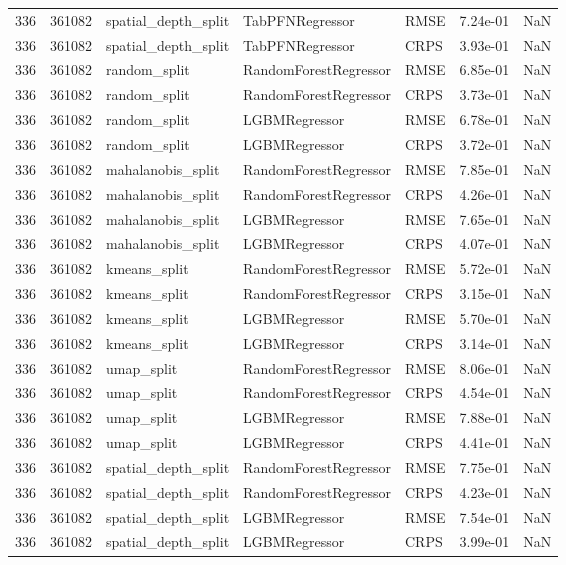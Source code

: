 \begin{tabular}{rrlllrr}
336 & 361082 & spatial\_depth\_split & TabPFNRegressor & RMSE & 7.24e-01 & NaN \\
336 & 361082 & spatial\_depth\_split & TabPFNRegressor & CRPS & 3.93e-01 & NaN \\
336 & 361082 & random\_split & RandomForestRegressor & RMSE & 6.85e-01 & NaN \\
336 & 361082 & random\_split & RandomForestRegressor & CRPS & 3.73e-01 & NaN \\
336 & 361082 & random\_split & LGBMRegressor & RMSE & 6.78e-01 & NaN \\
336 & 361082 & random\_split & LGBMRegressor & CRPS & 3.72e-01 & NaN \\
336 & 361082 & mahalanobis\_split & RandomForestRegressor & RMSE & 7.85e-01 & NaN \\
336 & 361082 & mahalanobis\_split & RandomForestRegressor & CRPS & 4.26e-01 & NaN \\
336 & 361082 & mahalanobis\_split & LGBMRegressor & RMSE & 7.65e-01 & NaN \\
336 & 361082 & mahalanobis\_split & LGBMRegressor & CRPS & 4.07e-01 & NaN \\
336 & 361082 & kmeans\_split & RandomForestRegressor & RMSE & 5.72e-01 & NaN \\
336 & 361082 & kmeans\_split & RandomForestRegressor & CRPS & 3.15e-01 & NaN \\
336 & 361082 & kmeans\_split & LGBMRegressor & RMSE & 5.70e-01 & NaN \\
336 & 361082 & kmeans\_split & LGBMRegressor & CRPS & 3.14e-01 & NaN \\
336 & 361082 & umap\_split & RandomForestRegressor & RMSE & 8.06e-01 & NaN \\
336 & 361082 & umap\_split & RandomForestRegressor & CRPS & 4.54e-01 & NaN \\
336 & 361082 & umap\_split & LGBMRegressor & RMSE & 7.88e-01 & NaN \\
336 & 361082 & umap\_split & LGBMRegressor & CRPS & 4.41e-01 & NaN \\
336 & 361082 & spatial\_depth\_split & RandomForestRegressor & RMSE & 7.75e-01 & NaN \\
336 & 361082 & spatial\_depth\_split & RandomForestRegressor & CRPS & 4.23e-01 & NaN \\
336 & 361082 & spatial\_depth\_split & LGBMRegressor & RMSE & 7.54e-01 & NaN \\
336 & 361082 & spatial\_depth\_split & LGBMRegressor & CRPS & 3.99e-01 & NaN \\

\end{tabular}
